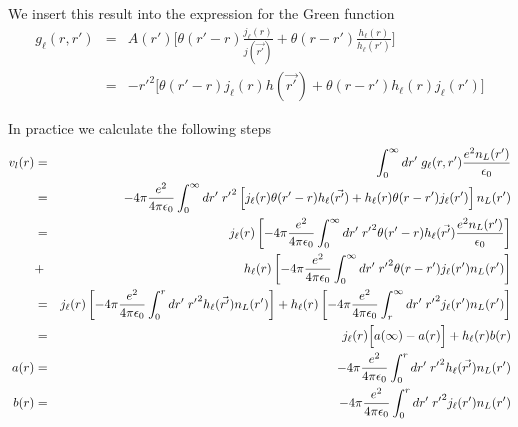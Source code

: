 \documentclass[11pt,a4paper]{report}
\begin{document}
We insert this result into the expression for the Green function
\begin{eqnarray}
g_\ell(r,r')
&=&A(r')\biggl[ \theta(r'-r) \frac{j_\ell(r)}{j(\vec{r'})}
+\theta(r-r')\frac{h_\ell(r)}{h_\ell(r')}\biggr]
\nonumber\\
&=&
-{r'}^2\biggl[ \theta(r'-r) j_\ell(r)h(\vec{r'})
+\theta(r-r')h_\ell(r)j_\ell(r')\biggr]
\end{eqnarray}

In practice we calculate the following steps
\begin{eqnarray}
v_l(r)&=&\int_0^\infty dr'\; g_\ell(r,r')\frac{e^2n_L(r')}{\epsilon_0}
\nonumber\\
&=&
-4\pi\frac{e^2}{4\pi\epsilon_0}
\int_0^\infty dr'\; {r'}^2
\left[j_\ell(r)\theta(r'-r)h_\ell(\vec{r'})
+h_\ell(r)\theta(r-r')j_\ell(r')
\right]n_L(r')
\nonumber\\
&=&
j_\ell(r)
\left[
-4\pi\frac{e^2}{4\pi\epsilon_0}
\int_0^\infty dr'\; {r'}^2\theta(r'-r) 
h_\ell(\vec{r'})
\frac{e^2n_L(r')}{\epsilon_0}\right]
\nonumber\\
&+&
h_\ell(r)
\left[
-4\pi\frac{e^2}{4\pi\epsilon_0}
\int_0^\infty dr'\; {r'}^2\theta(r-r')j_\ell(r')n_L(r')\right]
\nonumber\\
%
%
&=&
j_\ell(r)
\left[
-4\pi\frac{e^2}{4\pi\epsilon_0}
\int_0^{r} dr'\; {r'}^2
h_\ell(\vec{r'})n_L(r')\right]
+
h_\ell(r)
\left[
-4\pi\frac{e^2}{4\pi\epsilon_0}
\int_{r}^\infty dr'\; {r'}^2j_\ell(r')n_L(r')\right]
\nonumber\\
%
%
&=&
j_\ell(r)\Bigl[a(\infty)-a(r)\Bigr]
+
h_\ell(r)b(r)
\nonumber\\
a(r)&=&
-4\pi\frac{e^2}{4\pi\epsilon_0}
\int_0^r dr'\; {r'}^2h_\ell(\vec{r'})n_L(r')
\nonumber\\
b(r)&=&
-4\pi\frac{e^2}{4\pi\epsilon_0}
\int_0^r dr'\; {r'}^2j_\ell(r')n_L(r')
\end{eqnarray}



\end{document}
